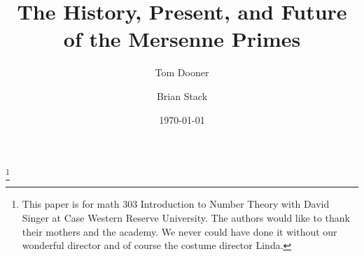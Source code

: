 \documentclass[]{amsart}
\theoremstyle{definition}
\numberwithin{equation}{section}
\begin{document}
\title{The History, Present, and Future of the Mersenne Primes}
\date{\today}


\thanks{This paper is for math 303 Introduction to Number Theory with David Singer at Case Western Reserve University. The authors would like to thank their mothers and the academy. We never could have done it without our wonderful director and of course the costume director Linda.}

\author{Tom Dooner}
\address{Case Western Reserve University, 
Cleveland, OH 44106}

\author{Brian Stack}
\address{Case Western Reserve University, 
Cleveland, OH 44106}

\maketitle








\end{document}
